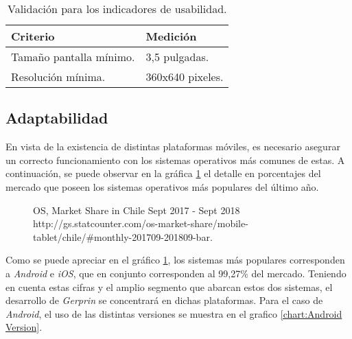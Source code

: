 \begin{table}[H]
    \caption[Validación para los indicadores de usabilidad.] {Validación para los indicadores de usabilidad.}
    \label{tbl:Criterios de Validación usabilidad}
    \begin{tabular}{|p{}|p{}|}
        \hline
        \textbf{Criterio} &  \textbf{Medición}\\
    	\hline
    	\hline
    	Tamaño pantalla mínimo. & 3,5 pulgadas. \\ \hline
		Resolución mínima.  & 360x640 pixeles. \\ 
        \hline
    \end{tabular}
\end{table}

\subsection{Adaptabilidad}

En vista de la existencia de distintas plataformas móviles, es necesario asegurar un correcto funcionamiento con los sistemas operativos más comunes de estas. A continuación, se puede observar en la gráfica \ref{chart:OS} el detalle en porcentajes del mercado que poseen los sistemas operativos más populares del último año.

\begin{figure}[H]
	\centering
	\caption[OS, Market Share in Chile Sept 2017 - Sept 2018.]{OS, Market Share in Chile Sept 2017 - Sept 2018 \\ http://gs.statcounter.com/os-market-share/mobile-tablet/chile/\#monthly-201709-201809-bar.}
	\label{chart:OS}
	\begin{bchart}[step=10, max=100, width=.8\textwidth, unit=\%]
	\end{bchart}
\end{figure}

Como se puede apreciar en el gráfico \ref{chart:OS}, los sistemas más populares corresponden a \textit{Android} e \textit{iOS}, que en conjunto corresponden al 99,27\% del mercado. Teniendo en cuenta estas cifras y el amplio segmento que abarcan estos dos sistemas, el desarrollo de \textit{Gerprin} se concentrará en dichas plataformas. Para el caso de \textit{Android}, el uso de las distintas versiones se muestra en el grafico \ref{chart:Android Version}.

